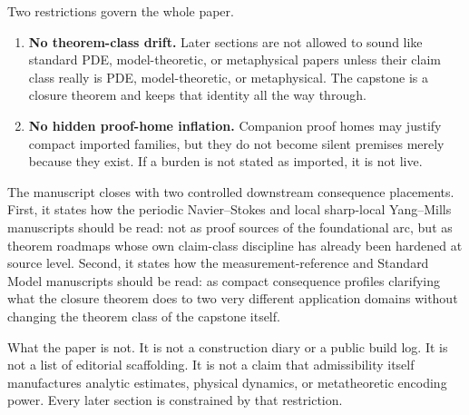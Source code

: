 Two restrictions govern the whole paper.
\begin{enumerate}
  \item \textbf{No theorem-class drift.} Later sections are not allowed to sound like standard PDE, model-theoretic, or metaphysical papers unless their claim class really is PDE, model-theoretic, or metaphysical. The capstone is a closure theorem and keeps that identity all the way through.
  \item \textbf{No hidden proof-home inflation.} Companion proof homes may justify compact imported families, but they do not become silent premises merely because they exist. If a burden is not stated as imported, it is not live.
\end{enumerate}

The manuscript closes with two controlled downstream consequence placements. First, it states how the periodic Navier--Stokes and local sharp-local Yang--Mills manuscripts should be read: not as proof sources of the foundational arc, but as theorem roadmaps whose own claim-class discipline has already been hardened at source level. Second, it states how the measurement-reference and Standard Model manuscripts should be read: as compact consequence profiles clarifying what the closure theorem does to two very different application domains without changing the theorem class of the capstone itself.

What the paper is not. It is not a construction diary or a public build log. It is not a list of editorial scaffolding. It is not a claim that admissibility itself manufactures analytic estimates, physical dynamics, or metatheoretic encoding power. Every later section is constrained by that restriction.
